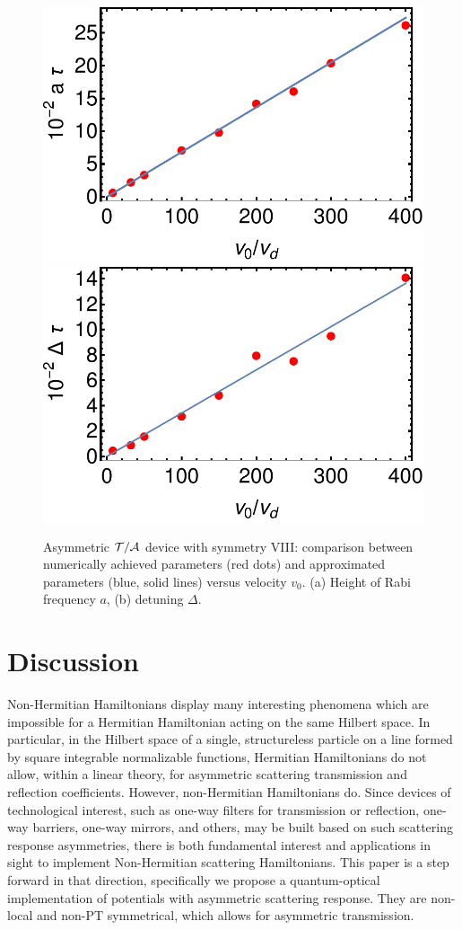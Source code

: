 \begin{figure}
	\begin{center}
		\includegraphics[width=0.48\linewidth]{Figures/asym_fig_t_a_param1.pdf}
		\includegraphics[width=0.48\linewidth]{Figures/asym_fig_t_a_param2.pdf}
	\end{center}
	\caption{Asymmetric ${\cal T/A}$ device with symmetry VIII: comparison between numerically achieved parameters (red dots) and approximated parameters (blue, solid lines) versus velocity $v_0$.
	(a) Height of Rabi frequency $a$, (b) detuning $\Delta$.
	\label{fig_t_a_param}}
\end{figure}

%
%
%
%

%
%
\section{Discussion}
Non-Hermitian Hamiltonians display many interesting phenomena which are
impossible for a  Hermitian Hamiltonian  acting on the same Hilbert space. In particular, in the Hilbert space of
a single, structureless particle on a line formed by square integrable normalizable functions, Hermitian Hamiltonians do not allow, within a linear theory, for asymmetric scattering transmission and reflection coefficients.
However,
non-Hermitian Hamiltonians do.   Since devices of technological interest, such as one-way filters for transmission or reflection, one-way barriers, one-way mirrors, and others, may be built based on such scattering response asymmetries, there is both fundamental
interest and applications in sight to implement Non-Hermitian scattering Hamiltonians.    This paper is a step forward in that direction, specifically we propose a quantum-optical implementation of potentials with asymmetric scattering response.
They are non-local and non-PT symmetrical, which allows for asymmetric transmission.


